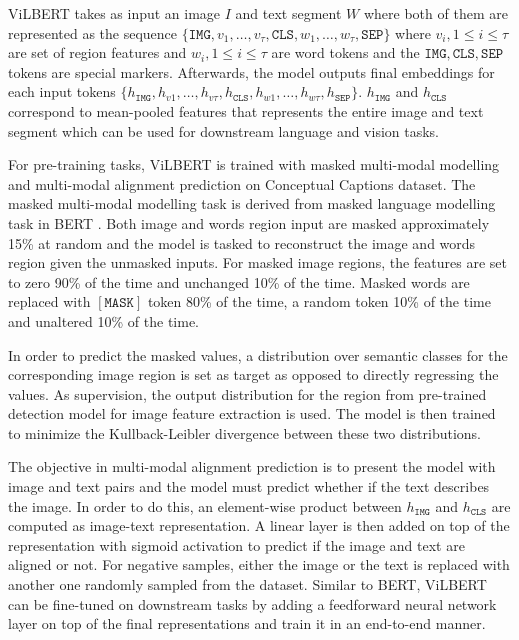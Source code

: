 \documentclass{article}
\begin{document}
ViLBERT takes as input an image $I$ and text segment $W$ where both of them are represented as the sequence $\{\mathtt{IMG}, v_{1}, \dots, v_{\tau}, \mathtt{CLS}, w_{1}, \dots, w_{\tau}, \mathtt{SEP}\}$ where $v_{i}, 1 \leq i \leq \tau$ are set of region features and $w_{i}, 1 \leq i \leq \tau$ are word tokens and the $\mathtt{IMG, CLS, SEP}$ tokens are special markers. Afterwards, the model outputs final embeddings for each input tokens $\{h_{\mathtt{IMG}}, h_{v1}, \dots, h_{v \tau}, h_{\mathtt{CLS}}, h_{w1}, \dots, h_{w \tau}, h_{\mathtt{SEP}}\}$. $h_{\mathtt{IMG}}$ and $h_{\mathtt{CLS}}$ correspond to mean-pooled features that represents the entire image and text segment which can be used for downstream language and vision tasks.

For pre-training tasks, ViLBERT is trained with masked multi-modal modelling and multi-modal alignment prediction on Conceptual Captions \citep{sharma-etal-2018-conceptual} dataset. The masked multi-modal modelling task is derived from masked language modelling task in BERT \citep{devlin-etal-2019-bert}. Both image and words region input are masked approximately 15\% at random and the model is tasked to reconstruct the image and words region given the unmasked inputs. For masked image regions, the features are set to zero 90\% of the time and unchanged 10\% of the time. Masked words are replaced with $[\mathtt{MASK}]$ token 80\% of the time, a random token 10\% of the time and unaltered 10\% of the time. 

In order to predict the masked values, a distribution over semantic classes for the corresponding image region is set as target as opposed to directly regressing the values. As supervision, the output distribution for the region from pre-trained detection model for image feature extraction is used. The model is then trained to minimize the Kullback-Leibler divergence between these two distributions.

The objective in multi-modal alignment prediction is to present the model with image and text pairs and the model must predict whether if the text describes the image. In order to do this, an element-wise product between $h_{\mathtt{IMG}}$ and $h_{\mathtt{CLS}}$ are computed as image-text representation. A linear layer is then added on top of the representation with sigmoid activation to predict if the image and text are aligned or not. For negative samples, either the image or the text is replaced with another one randomly sampled from the dataset. Similar to BERT, ViLBERT can be fine-tuned on downstream tasks by adding a feedforward neural network layer on top of the final representations and train it in an end-to-end manner.
\end{document}
